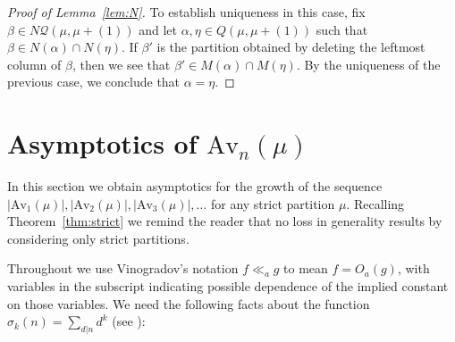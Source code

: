 \documentclass{article}
\theoremstyle{plain}
\theoremstyle{definition}
\newcommand{\Av}{\text{Av}}
\newcommand{\Q}{\mathcal{Q}}
\begin{document}
\begin{proof}[Proof of Lemma~\ref{lem:N}]
To establish uniqueness in this case, fix $\beta \in N\Q(\mu, \mu +(1))$ and let $\alpha, \eta \in Q(\mu,\mu+(1))$ such that $\beta \in N(\alpha)\cap N(\eta )$.  If $\beta'$ is the partition obtained by deleting the leftmost column of $\beta$, then we see that $\beta' \in M(\alpha)\cap M(\eta )$.  By the uniqueness of the previous case, we conclude that $\alpha = \eta $.  
\end{proof}



 



















\section{Asymptotics of $\Av_n(\mu)$}\label{sec:growth}



In this section we obtain asymptotics for the growth of the sequence $|\Av_1(\mu)|,|\Av_2(\mu)|,|\Av_3(\mu)|,\ldots$ for any strict partition $\mu$. Recalling Theorem~\ref{thm:strict} we remind the reader that no loss in generality results by considering only strict partitions.   

Throughout we use Vinogradov's notation $f \ll_a g $ to mean $f = O_a(g)$, with variables in the subscript indicating possible dependence of the implied constant on those variables.  We need the following facts about the function $\sigma_k(n) = \sum_{d|n} d^k$ (see \cite{HardyWright}):
\end{document}
